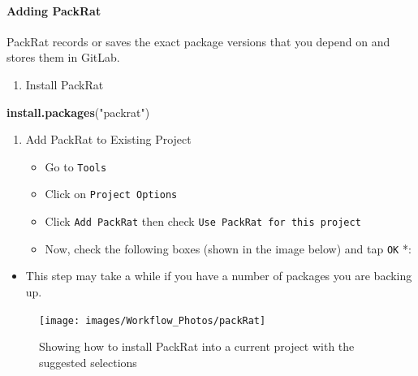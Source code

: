 \documentclass[openany]{article}
\newenvironment{Shaded}{\begin{snugshade}}{\end{snugshade}}
\newcommand{\KeywordTok}[1]{\textcolor[rgb]{0.13,0.29,0.53}{\textbf{#1}}}
\newcommand{\NormalTok}[1]{#1}
\newcommand{\StringTok}[1]{\textcolor[rgb]{0.31,0.60,0.02}{#1}}
\providecommand{\tightlist}{%
  \setlength{\itemsep}{0pt}\setlength{\parskip}{0pt}}
\let\oldparagraph\paragraph
\renewcommand{\paragraph}[1]{\oldparagraph{#1}\mbox{}}
\begin{document}
\hypertarget{adding-packrat}{%
\paragraph{Adding PackRat}\label{adding-packrat}}

PackRat records or saves the exact package versions that you depend on and stores them in GitLab.

\begin{enumerate}
\def\labelenumi{\arabic{enumi}.}
\tightlist
\item
  Install PackRat
\end{enumerate}

\begin{Shaded}
\begin{Highlighting}[]
\KeywordTok{install.packages}\NormalTok{(}\StringTok{"packrat"}\NormalTok{)}
\end{Highlighting}
\end{Shaded}

\begin{enumerate}
\def\labelenumi{\arabic{enumi}.}
\setcounter{enumi}{1}
\item
  Add PackRat to Existing Project

  \begin{itemize}
  \tightlist
  \item
    Go to \texttt{Tools}
  \item
    Click on \texttt{Project\ Options}
  \item
    Click \texttt{Add\ PackRat} then check \texttt{Use\ PackRat\ for\ this\ project}
  \item
    Now, check the following boxes (shown in the image below) and tap \texttt{OK} *:
  \end{itemize}
\end{enumerate}

\begin{itemize}
\tightlist
\item
  This step may take a while if you have a number of packages you are backing up.
\end{itemize}

\begin{figure}

{\centering \texttt{[image: images/Workflow\_Photos/packRat]} 

}

\caption{Showing how to install PackRat into a current project with the suggested selections}\label{fig:c999}
\end{figure}
\end{document}
